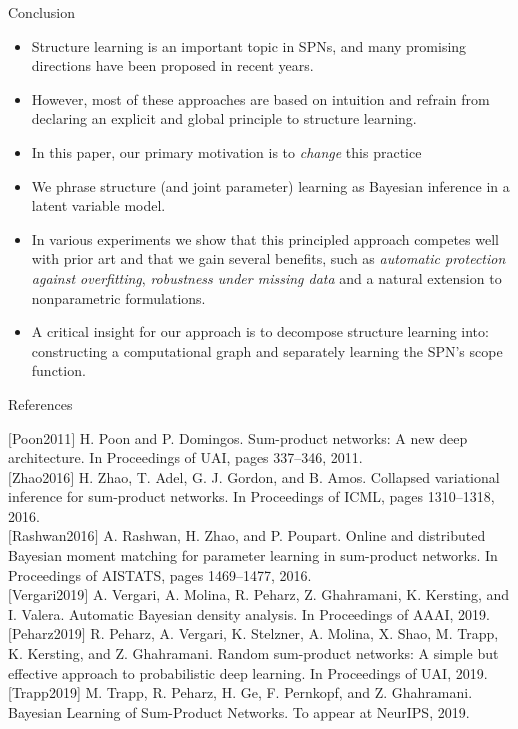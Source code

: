 \documentclass{beamer}
\begin{document}
\begin{frame}{}
\begin{center}Conclusion\end{center}
    \begin{itemize}
    \item Structure learning is an important topic in SPNs, and many promising directions have been proposed in recent years.
  \item However, most of these approaches are based on intuition and refrain from declaring an explicit and global principle to structure learning.
  \item In this paper, our primary motivation is to \emph{change} this practice
  \pause
  \item We phrase structure (and joint parameter) learning as Bayesian inference in a latent variable model. 
  \item In various experiments we show that this principled approach competes well with prior art and that we gain several benefits, such as \emph{automatic protection against overfitting}, \emph{robustness under missing data} and a natural extension to nonparametric formulations.
  \pause
  \item A critical insight for our approach is to decompose structure learning into: constructing a computational graph and separately learning the SPN's scope function.
  \end{itemize}
\end{frame}

\begin{frame}{}
\begin{center}References\end{center}
 \scriptsize $[$Poon2011$]$  H. Poon and P. Domingos. Sum-product networks: A new deep architecture. In Proceedings of UAI, pages 337–346, 2011.\\[1em]
  $[$Zhao2016$]$ H. Zhao, T. Adel, G. J. Gordon, and B. Amos. Collapsed variational inference for sum-product networks. In Proceedings of ICML, pages 1310–1318, 2016. \\[1em]
  $[$Rashwan2016$]$ A. Rashwan, H. Zhao, and P. Poupart. Online and distributed Bayesian moment matching for parameter learning in sum-product networks. In Proceedings of AISTATS, pages 1469–1477, 2016.\\[1em]
  $[$Vergari2019$]$ A. Vergari, A. Molina, R. Peharz, Z. Ghahramani, K. Kersting, and I. Valera. Automatic Bayesian density analysis. In Proceedings of AAAI, 2019.\\[1em]
  $[$Peharz2019$]$ R. Peharz, A. Vergari, K. Stelzner, A. Molina, X. Shao, M. Trapp, K. Kersting, and Z. Ghahramani. Random sum-product networks: A simple but effective approach to probabilistic deep learning. In Proceedings of UAI, 2019.\\[1em]
  \textcolor{CBYellow}{[Trapp2019] M. Trapp, R. Peharz, H. Ge, F. Pernkopf, and Z. Ghahramani. Bayesian Learning of Sum-Product Networks. To appear at NeurIPS, 2019.}
\end{frame}
\end{document}
